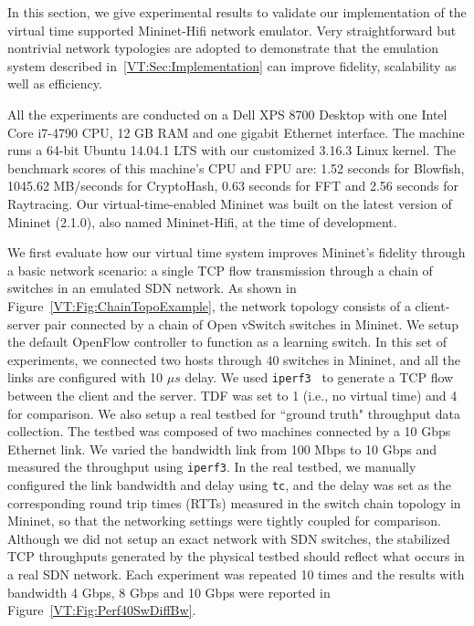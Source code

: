 \label{VT:Sec:Experiments}

In this section, we give experimental results to validate our implementation of the virtual time supported Mininet-Hifi network emulator.
Very straightforward but nontrivial network typologies are adopted to demonstrate
that the emulation system described in~\ref{VT:Sec:Implementation} can improve fidelity, scalability as well as efficiency. 

All the experiments are conducted on a Dell XPS 8700 Desktop with one Intel Core i7-4790 CPU,
12 GB RAM and one gigabit Ethernet interface. The machine runs a 64-bit Ubuntu 14.04.1 LTS with our customized 3.16.3 Linux kernel.
The benchmark scores of this machine's CPU and FPU are: 1.52 seconds for Blowfish, 1045.62 MB/seconds for CryptoHash,
0.63 seconds for FFT and 2.56 seconds for Raytracing. Our virtual-time-enabled Mininet was built on the latest version of Mininet (2.1.0),
also named Mininet-Hifi, at the time of development.

We first evaluate how our virtual time system improves Mininet's fidelity through a basic network scenario:
a single TCP flow transmission through a chain of switches in an emulated SDN network.
As shown in Figure~\ref{VT:Fig:ChainTopoExample}, the network topology consists of a client-server pair connected by a chain of Open vSwitch switches in Mininet.
We setup the default OpenFlow controller to function as a learning switch.
In this set of experiments, we connected two hosts through 40 switches in Mininet, and all the links are configured with 10 $\mu s$ delay.
We used \texttt{iperf3}~\cite{iperf3} to generate a TCP flow between the client and the server.
TDF was set to 1 (i.e., no virtual time) and 4 for comparison. We also setup a real testbed for ``ground truth" throughput data collection.
The testbed was composed of two machines connected by a 10 Gbps Ethernet link.
We varied the bandwidth link from 100 Mbps to 10 Gbps and measured the throughput using \texttt{iperf3}.
In the real testbed, we manually configured the link bandwidth and delay using \texttt{tc},
and the delay was set as the corresponding round trip times (RTTs) measured in the switch chain topology in Mininet,
so that the networking settings were tightly coupled for comparison.
Although we did not setup an exact network with SDN switches,
the stabilized TCP throughputs generated by the physical testbed should reflect what occurs in a real SDN network.
Each experiment was repeated 10 times and the results with bandwidth 4 Gbps, 8 Gbps and 10 Gbps were reported in Figure~\ref{VT:Fig:Perf40SwDiffBw}. 

